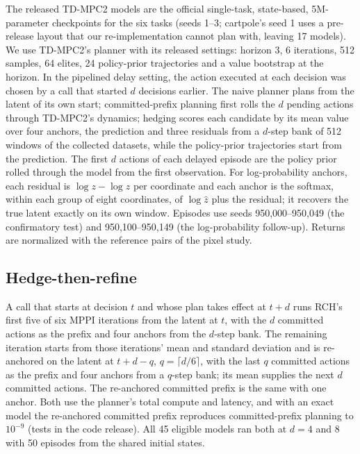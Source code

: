 \documentclass[aps,physrev,\manuscriptlayout,superscriptaddress,
  longbibliography,amsmath,amssymb]{revtex4-2}
\begin{document}
The released TD-MPC2 models are the official single-task, state-based, 5M-parameter checkpoints for the six tasks (seeds 1--3; cartpole's seed 1 uses a pre-release layout that our re-implementation cannot plan with, leaving 17 models). We use TD-MPC2's planner with its released settings: horizon 3, 6 iterations, 512 samples, 64 elites, 24 policy-prior trajectories and a value bootstrap at the horizon. In the pipelined delay setting, the action executed at each decision was chosen by a call that started $d$ decisions earlier. The naive planner plans from the latent of its own start; committed-prefix planning first rolls the $d$ pending actions through TD-MPC2's dynamics; hedging scores each candidate by its mean value over four anchors, the prediction and three residuals from a $d$-step bank of 512 windows of the collected datasets, while the policy-prior trajectories start from the prediction. The first $d$ actions of each delayed episode are the policy prior rolled through the model from the first observation. For log-probability anchors, each residual is $\log z-\log\hat z$ per coordinate and each anchor is the softmax, within each group of eight coordinates, of $\log\hat z$ plus the residual; it recovers the true latent exactly on its own window. Episodes use seeds 950,000--950,049 (the confirmatory test) and 950,100--950,149 (the log-probability follow-up). Returns are normalized with the reference pairs of the pixel study.

\subsection{Hedge-then-refine}\label{app:htr}

A call that starts at decision $t$ and whose plan takes effect at $t+d$ runs RCH's first five of six MPPI iterations from the latent at $t$, with the $d$ committed actions as the prefix and four anchors from the $d$-step bank. The remaining iteration starts from those iterations' mean and standard deviation and is re-anchored on the latent at $t+d-q$, $q=\lceil d/6\rceil$, with the last $q$ committed actions as the prefix and four anchors from a $q$-step bank; its mean supplies the next $d$ committed actions. The re-anchored committed prefix is the same with one anchor. Both use the planner's total compute and latency, and with an exact model the re-anchored committed prefix reproduces committed-prefix planning to $10^{-9}$ (tests in the code release). All 45 eligible models ran both at $d=4$ and $8$ with 50 episodes from the shared initial states.
\end{document}
